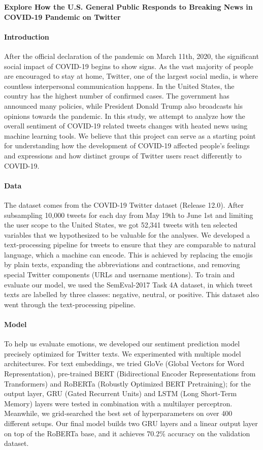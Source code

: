\documentclass{article}
\begin{document}
\noindent \textbf{\large Explore How the U.S. General Public Responds to Breaking News in COVID-19 Pandemic on Twitter}
\paragraph{Introduction}

After the official declaration of the pandemic on March 11th, 2020, the significant social impact of COVID-19 begins to show signs. As the vast majority of people are encouraged to stay at home, Twitter, one of the largest social media, is where countless interpersonal communication happens. In the United States, the country has the highest number of confirmed cases. The government has announced many policies, while President Donald Trump also broadcasts his opinions towards the pandemic. In this study, we attempt to analyze how the overall sentiment of COVID-19 related tweets changes with heated news using machine learning tools. We believe that this project can serve as a starting point for understanding how the development of COVID-19 affected people's feelings and expressions and how distinct groups of Twitter users react differently to COVID-19.

\paragraph{Data} The dataset comes from the COVID-19 Twitter dataset (Release 12.0). After subsampling 10,000 tweets for each day from May 19th to June 1st and limiting the user scope to the United States, we got 52,341 tweets with ten selected variables that we hypothesized to be valuable for the analyses. We developed a text-processing pipeline for tweets to ensure that they are comparable to natural language, which a machine can encode. This is achieved by replacing the emojis by plain texts, expanding the abbreviations and contractions, and removing special Twitter components (URLs and username mentions). To train and evaluate our model, we used the SemEval-2017 Task 4A dataset, in which tweet texts are labelled by three classes: negative, neutral, or positive. This dataset also went through the text-processing pipeline.

\paragraph{Model} 
To help us evaluate emotions, we developed our sentiment prediction model precisely optimized for Twitter texts. We experimented with multiple model architectures. For text embeddings, we tried GloVe (Global Vectors for Word Representation), pre-trained BERT (Bidirectional Encoder Representations from Transformers) and RoBERTa (Robustly Optimized BERT Pretraining); for the output layer, GRU (Gated Recurrent Units) and LSTM (Long Short-Term Memory) layers were tested in combination with a multilayer perceptron. Meanwhile, we grid-searched the best set of hyperparameters on over 400 different setups. Our final model builds two GRU layers and a linear output layer on top of the RoBERTa base, and it achieves 70.2\% accuracy on the validation dataset.
\end{document}
